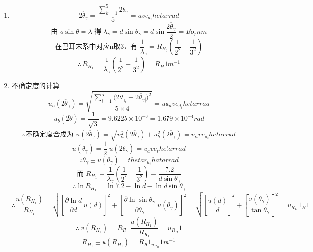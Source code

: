 \begin{enumerate}
  \item { }
      $$\overline{2{\theta}_{\gamma}} = \displaystyle\frac{\sum_{k=1}^5 2{\theta}_{\gamma}}{5} = {{ave_d_thetar}}rad$$
      $$\displaystyle\text{由\ }d\sin{\theta} = {\lambda}\text{\ 得\ }{\lambda}_{\gamma} = d\sin{\theta}_{\gamma} = d\sin{\frac{\overline{2{\theta}_{\gamma}}}{2}} = {{Bo_r}} nm $$
      $$\displaystyle\text{在巴耳末系中对应n取3，有\ }\frac{1}{\lambda}_{\gamma} = R_{H_1}\left(\frac{1}{2^2}-\frac{1}{3^2}\right)$$
      $$\therefore\ \displaystyle R_{H_{1}} = \frac{1}{ {\lambda}_{\gamma}}\left(\frac{1}{2^2}-\frac{1}{3^2}\right) = {{R_H1}}m^{-1}$$
  \item {不确定度的计算}
      $$u_a(\overline{2{\theta}_{\gamma}}) = \displaystyle\sqrt{\frac{\sum_{i=1}^{5} {(2{\theta}_{ {\gamma}_{i}}-\overline{2{\theta}_{\gamma]}}})^2}{5\times4}}={{ua_ave_d_thetar}}rad$$
      $$u_b(\overline{2\theta}) = \displaystyle\frac{1}{\sqrt3} = 9.6225\times10^{-3} = 1.679 \times 10^{-4} rad$$
      $$\therefore\text{不确定度合成为\ }u(\overline{2{\theta}_{\gamma}}) = \sqrt{u_a^2(\overline{2{\theta}_{\gamma}})+u_b^2(\overline{2{\theta}_{\gamma}})} = {{u_ave_d_thetar}}rad$$
      $$u(\overline{ {\theta}_{\gamma}})= \displaystyle\frac12\ u(\overline{2{\theta}_{\gamma}}) = {{u_ave_thetar}}rad$$
      $$\therefore{\theta}_{\gamma} \pm u({\theta}_{\gamma}) = {{thetar_u_thatar}}rad$$
      $$\text{而\ }\displaystyle R_{H_1} = \frac{1}{ {\lambda}_{\gamma}}\left(\frac{1}{2^2}-\frac{1}{3^2}\right) = \frac{7.2}{d\sin{\theta}_{\gamma}}$$
      $$\therefore\ln{R_{H_1}} = \ln{7.2} -\ln{d} - \ln{d\sin{\theta}_{\gamma}}$$
      $$\therefore\displaystyle \frac{u(R_{H_1})}{R_{H_1}} = \sqrt{ {\left[\frac{\partial{\ln{d}}}{\partial{d}}\ u(d)\right]}^2 + {\left[\frac{\partial{\ln{\sin{ {\theta}_{\gamma}}}}}{\partial{ {\theta}_{\gamma}}}\ u({\theta}_{\gamma})\right]}^2} = \sqrt{  {\left[\frac{u(d)}{d}\right]}^2 + {\left[\frac{u({\theta}_{\gamma})}{\tan{ {\theta}_{\gamma}}}\right]}^2} = {{u_R_H1_H1}}$$
      $$\therefore \ u(R_{H_1}) = \displaystyle R_{H_1}\ \frac{u(R_{H_1})}{R_{H_1}} = {{u_R_H1}}$$ 
      $$R_{H_1} \pm u(R_{H_1}) = {{R_H1_u_R_H1}}m^{-1}$$
\end{enumerate}

